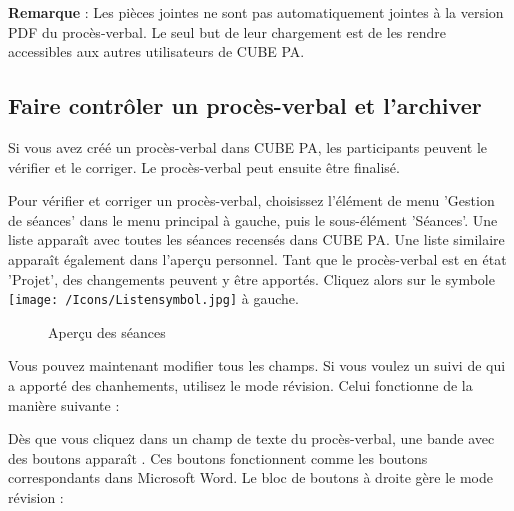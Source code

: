 \vspace{\baselineskip}

\textbf{Remarque} : Les pièces jointes ne sont pas automatiquement jointes à la version PDF du procès-verbal. Le seul but de leur chargement est de les rendre accessibles aux autres utilisateurs de CUBE PA.

\subsection{Faire contrôler un procès-verbal et l'archiver}
\label{bkm:Ref434478117}
Si vous avez créé un procès-verbal dans CUBE PA, les participants peuvent le vérifier et le corriger. Le procès-verbal peut ensuite être finalisé.

\vspace{\baselineskip}

Pour vérifier et corriger un procès-verbal, choisissez l'élément de menu 'Gestion de séances' dans le menu principal à gauche, puis le sous-élément 'Séances'. Une liste apparaît avec toutes les séances recensés dans CUBE PA. Une liste similaire apparaît également dans l'aperçu personnel. Tant que le procès-verbal est en état 'Projet', des changements peuvent y être apportés. Cliquez alors sur le symbole \texttt{[image: /Icons/Listensymbol.jpg]}  à gauche.

\begin{figure}[H]
\caption{Aperçu des séances}
\end{figure}

\vspace{\baselineskip}

Vous pouvez maintenant modifier tous les champs. Si vous voulez un suivi de qui a apporté des chanhements, utilisez le mode révision. Celui fonctionne de la manière suivante :

\vspace{\baselineskip}

Dès que vous cliquez dans un champ de texte du procès-verbal, une bande avec des boutons apparaît . Ces boutons fonctionnent comme les boutons correspondants dans Microsoft Word. Le bloc de boutons à droite gère le mode révision :

